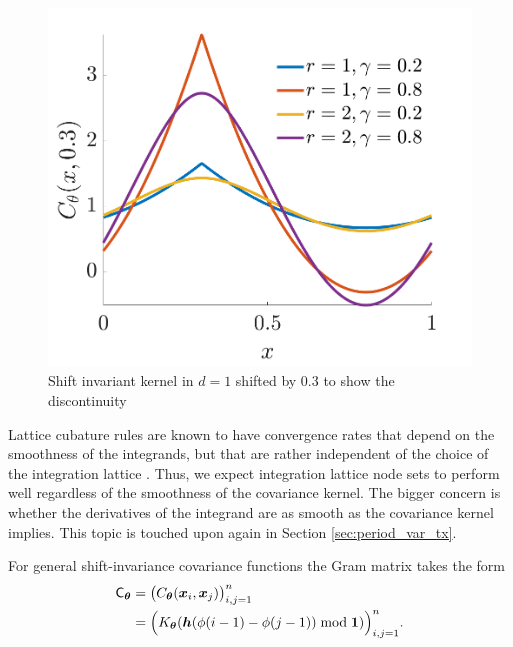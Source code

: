 \documentclass{iitthesis}          %
\newcommand{\bm}[1]{\boldsymbol{#1}}
\newcommand{\vtheta}{{\bm{\theta}}}
\newcommand{\vh}{\bm{h}}
\newcommand{\vx}{\bm{x}}
\newcommand{\vone}{\bm{1}}
\newcommand{\mC}{\mathsf{C}}
\begin{document}
\begin{figure}
	\centering
	\includegraphics[width=0.9\linewidth]{"figures/fourier_kernel_dim_1"}
	\caption[Fourier kernel]{Shift invariant kernel in $d=1$ shifted by 0.3 to show the discontinuity}
	\label{fig:fourierkernel-dim1}
\end{figure}
Lattice cubature rules are known to have convergence rates that depend on the smoothness of the integrands, but that are rather independent of the choice of the integration lattice \cite{DicEtal14a}.  Thus, we expect integration lattice node sets to perform well regardless of the smoothness of the covariance kernel.  The bigger concern is whether the derivatives of the integrand are as smooth as the covariance kernel implies.  This topic is touched upon again in Section \ref{sec:period_var_tx}.


For general shift-invariance covariance functions the Gram matrix takes the form
\begin{align}
\label{shInvKernGramMatrix}
\mC_\vtheta &= \bigl ( C_\vtheta(\vx_i, \vx_j) \bigr)_{i, j = 1}^n \\
& = \Bigl ( K_\vtheta(\vh(\phi(i-1) - \phi(j-1)) \bmod \vone ) \Bigr)_{i, j = 1}^n.
\end{align}
\end{document}
